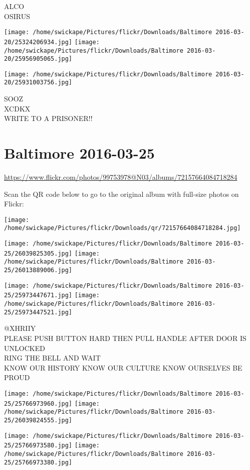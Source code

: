 \documentclass[10pt,letterpaper]{article}
\begin{document}
ALCO\\
OSIRUS
\pagebreak

\texttt{[image: /home/swickape/Pictures/flickr/Downloads/Baltimore 2016-03-20/25324206934.jpg]}
\texttt{[image: /home/swickape/Pictures/flickr/Downloads/Baltimore 2016-03-20/25956905065.jpg]}

\texttt{[image: /home/swickape/Pictures/flickr/Downloads/Baltimore 2016-03-20/25931003756.jpg]}

SOOZ\\
XCDKX\\
WRITE TO A PRISONER!!
\pagebreak

\section*{Baltimore 2016-03-25}

\url{https://www.flickr.com/photos/99753978@N03/albums/72157664084718284}

Scan the QR code below to go to the original album with full-size photos on Flickr:

\texttt{[image: /home/swickape/Pictures/flickr/Downloads/qr/72157664084718284.jpg]}
\pagebreak

\texttt{[image: /home/swickape/Pictures/flickr/Downloads/Baltimore 2016-03-25/26039825305.jpg]}
\texttt{[image: /home/swickape/Pictures/flickr/Downloads/Baltimore 2016-03-25/26013889006.jpg]}

\texttt{[image: /home/swickape/Pictures/flickr/Downloads/Baltimore 2016-03-25/25973447671.jpg]}
\texttt{[image: /home/swickape/Pictures/flickr/Downloads/Baltimore 2016-03-25/25973447521.jpg]}

@XHRIIY\\
PLEASE PUSH BUTTON HARD THEN PULL HANDLE AFTER DOOR IS UNLOCKED\\
RING THE BELL AND WAIT\\
KNOW OUR HISTORY KNOW OUR CULTURE KNOW OURSELVES BE PROUD
\pagebreak

\texttt{[image: /home/swickape/Pictures/flickr/Downloads/Baltimore 2016-03-25/25766973960.jpg]}
\texttt{[image: /home/swickape/Pictures/flickr/Downloads/Baltimore 2016-03-25/26039824555.jpg]}

\texttt{[image: /home/swickape/Pictures/flickr/Downloads/Baltimore 2016-03-25/25766973580.jpg]}
\texttt{[image: /home/swickape/Pictures/flickr/Downloads/Baltimore 2016-03-25/25766973380.jpg]}
\end{document}
